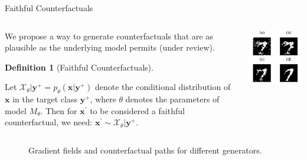 \documentclass[
  ignorenonframetext,
]{beamer}
\theoremstyle{definition}
\newtheorem{definition}{Definition}[section]
\theoremstyle{remark}
\begin{document}
\begin{frame}{Faithful Counterfactuals}
\label{faithful-counterfactuals}
\begin{columns}[T]
\begin{column}{0.6\textwidth}
We propose a way to generate counterfactuals that are as plausible as
the underlying model permits (under review).

\begin{definition}[Faithful
Counterfactuals]\protect\hypertarget{def-faithful}{}\label{def-faithful}

Let
\(\mathcal{X}_{\theta}|\mathbf{y}^+ = p_{\theta}(\mathbf{x}|\mathbf{y}^+)\)
denote the conditional distribution of \(\mathbf{x}\) in the target
class \(\mathbf{y}^+\), where \(\theta\) denotes the parameters of model
\(M_{\theta}\). Then for \(\mathbf{x}^{\prime}\) to be considered a
faithful counterfactual, we need:
\(\mathbf{x}^{\prime} \sim \mathcal{X}_{\theta}|\mathbf{y}^+\).

\end{definition}
\end{column}

\begin{column}{0.4\textwidth}
\includegraphics{www/mnist_eccco_new.png}
\end{column}
\end{columns}

\begin{figure}


\caption{\label{fig-poc-gradient-fields}Gradient fields and
counterfactual paths for different generators.}

\end{figure}%
\end{frame}
\end{document}
